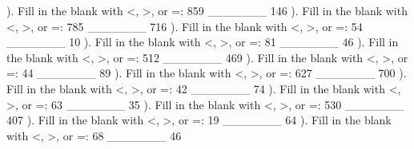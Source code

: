 \documentclass{article}%
\begin{document}
\newline%
). Fill in the blank with <, >, or =: 859 \_\_\_\_\_\_\_ 146%
\newline%
\newline%
). Fill in the blank with <, >, or =: 785 \_\_\_\_\_\_\_ 716%
\newline%
\newline%
). Fill in the blank with <, >, or =: 54 \_\_\_\_\_\_\_ 10%
\newline%
\newline%
). Fill in the blank with <, >, or =: 81 \_\_\_\_\_\_\_ 46%
\newline%
\newline%
). Fill in the blank with <, >, or =: 512 \_\_\_\_\_\_\_ 469%
\newline%
\newline%
). Fill in the blank with <, >, or =: 44 \_\_\_\_\_\_\_ 89%
\newline%
\newline%
). Fill in the blank with <, >, or =: 627 \_\_\_\_\_\_\_ 700%
\newline%
\newline%
). Fill in the blank with <, >, or =: 42 \_\_\_\_\_\_\_ 74%
\newline%
\newline%
). Fill in the blank with <, >, or =: 63 \_\_\_\_\_\_\_ 35%
\newline%
\newline%
). Fill in the blank with <, >, or =: 530 \_\_\_\_\_\_\_ 407%
\newline%
\newline%
). Fill in the blank with <, >, or =: 19 \_\_\_\_\_\_\_ 64%
\newline%
\newline%
). Fill in the blank with <, >, or =: 68 \_\_\_\_\_\_\_ 46%
\newline%
\newline%
\end{document}
